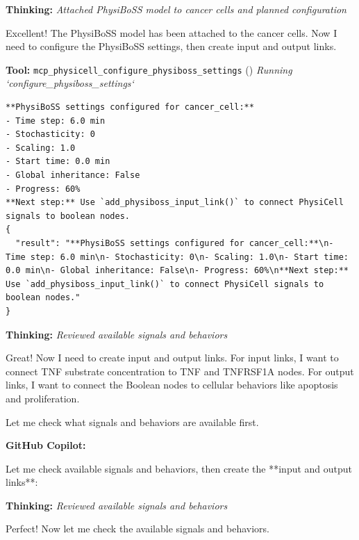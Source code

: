 \documentclass[11pt,a4paper]{article}
\begin{document}
\begin{thinkbox}
\textbf{Thinking:} \textit{Attached PhysiBoSS model to cancer cells and planned configuration}

Excellent! The PhysiBoSS model has been attached to the cancer cells. Now I need to configure the PhysiBoSS settings, then create input and output links.

\end{thinkbox}
\begin{toolokbox}
\textbf{Tool:} \texttt{mcp\_physicell\_configure\_physiboss\_settings} (\checkmark)
\textit{Running `configure\_physiboss\_settings`}
\begin{lstlisting}
**PhysiBoSS settings configured for cancer_cell:**
- Time step: 6.0 min
- Stochasticity: 0
- Scaling: 1.0
- Start time: 0.0 min
- Global inheritance: False
- Progress: 60%
**Next step:** Use `add_physiboss_input_link()` to connect PhysiCell signals to boolean nodes.
{
  "result": "**PhysiBoSS settings configured for cancer_cell:**\n- Time step: 6.0 min\n- Stochasticity: 0\n- Scaling: 1.0\n- Start time: 0.0 min\n- Global inheritance: False\n- Progress: 60%\n**Next step:** Use `add_physiboss_input_link()` to connect PhysiCell signals to boolean nodes."
}
\end{lstlisting}
\end{toolokbox}
\begin{thinkbox}
\textbf{Thinking:} \textit{Reviewed available signals and behaviors}

Great! Now I need to create input and output links. For input links, I want to connect TNF substrate concentration to TNF and TNFRSF1A nodes. For output links, I want to connect the Boolean nodes to cellular behaviors like apoptosis and proliferation.

Let me check what signals and behaviors are available first.

\end{thinkbox}
\begin{copilotbox}
\textbf{GitHub Copilot:}

Let me check available signals and behaviors, then create the **input and output links**:

\end{copilotbox}
\begin{thinkbox}
\textbf{Thinking:} \textit{Reviewed available signals and behaviors}

Perfect! Now let me check the available signals and behaviors.

\end{thinkbox}
\end{document}
